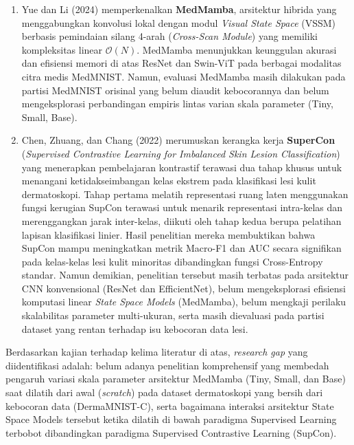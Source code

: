 \begin{enumerate}[noitemsep]
	\item Yue dan Li (2024) \cite{yue2024medmamba} memperkenalkan \textbf{MedMamba}, arsitektur hibrida yang menggabungkan konvolusi lokal dengan modul \textit{Visual State Space} (VSSM) berbasis pemindaian silang 4-arah (\textit{Cross-Scan Module}) yang memiliki kompleksitas linear $\mathcal{O}(N)$. MedMamba menunjukkan keunggulan akurasi dan efisiensi memori di atas ResNet dan Swin-ViT \cite{liu2021swin} pada berbagai modalitas citra medis MedMNIST. Namun, evaluasi MedMamba masih dilakukan pada partisi MedMNIST orisinal yang belum diaudit kebocorannya dan belum mengeksplorasi perbandingan empiris lintas varian skala parameter (Tiny, Small, Base). \par

	\item Chen, Zhuang, dan Chang (2022) \cite{chen2022supercon} merumuskan kerangka kerja \textbf{SuperCon} (\textit{Supervised Contrastive Learning for Imbalanced Skin Lesion Classification}) yang menerapkan pembelajaran kontrastif terawasi dua tahap khusus untuk menangani ketidakseimbangan kelas ekstrem pada klasifikasi lesi kulit dermatoskopi. Tahap pertama melatih representasi ruang laten menggunakan fungsi kerugian SupCon terawasi untuk menarik representasi intra-kelas dan merenggangkan jarak inter-kelas, diikuti oleh tahap kedua berupa pelatihan lapisan klasifikasi linier. Hasil penelitian mereka membuktikan bahwa SupCon mampu meningkatkan metrik Macro-F1 dan AUC secara signifikan pada kelas-kelas lesi kulit minoritas dibandingkan fungsi Cross-Entropy standar. Namun demikian, penelitian tersebut masih terbatas pada arsitektur CNN konvensional (ResNet dan EfficientNet), belum mengeksplorasi efisiensi komputasi linear \textit{State Space Models} (MedMamba), belum mengkaji perilaku skalabilitas parameter multi-ukuran, serta masih dievaluasi pada partisi dataset yang rentan terhadap isu kebocoran data lesi. \par
\end{enumerate}

Berdasarkan kajian terhadap kelima literatur di atas,  \textit{research gap} yang diidentifikasi adalah: belum adanya penelitian komprehensif yang membedah pengaruh variasi skala parameter arsitektur MedMamba (Tiny, Small, dan Base) saat dilatih dari awal (\textit{scratch}) pada dataset dermatoskopi yang bersih dari kebocoran data (DermaMNIST-C), serta bagaimana interaksi arsitektur State Space Models tersebut ketika dilatih di bawah paradigma Supervised Learning terbobot dibandingkan paradigma Supervised Contrastive Learning (SupCon). \par


